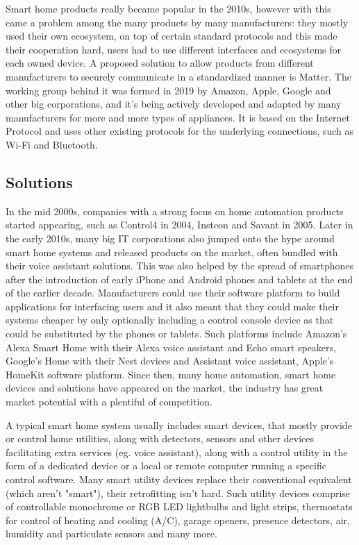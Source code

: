 Smart home products really became popular in the 2010s, however with this came a problem among the many products by many manufacturers: they mostly used their own ecosystem, on top of certain standard protocols and this made their cooperation hard, users had to use different interfaces and ecosystems for each owned device. A proposed solution to allow products from different manufacturers to securely communicate in a standardized manner is Matter. \cite{PCMagMatter} The working group behind it was formed in 2019 by Amazon, Apple, Google and other big corporations, and it's being actively developed and adapted by many manufacturers for more and more types of appliances. It is based on the Internet Protocol and uses other existing protocols for the underlying connections, such as Wi-Fi and Bluetooth.

\subsection{Solutions}

In the mid 2000s, companies with a strong focus on home automation products started appearing, such as Control4 in 2004, Insteon and Savant in 2005. \cite{Control4about} \cite{WPInsteonFirstLook} \cite{SavantCompInfo}\break
Later in the early 2010s, many big IT corporations also jumped onto the hype around smart home systems and released products on the market, often bundled with their voice assistant solutions. This was also helped by the spread of smartphones after the introduction of early iPhone and Android phones and tablets at the end of the earlier decade. Manufacturers could use their software platform to build applications for interfacing users and it also meant that they could make their systems cheaper by only optionally including a control console device as that could be substituted by the phones or tablets. Such platforms include Amazon's Alexa Smart Home with their Alexa voice assistant and Echo smart speakers, Google's Home with their Nest devices and Assistant voice assistant, Apple's HomeKit software platform. \cite{AmazonAlexaSH} \cite{GoogleHome} \cite{GoogleAssistant} \cite{AppleHome} Since then, many home automation, smart home devices and solutions have appeared on the market, the industry has great market potential with a plentiful of competition. \cite{ChakSHS}

A typical smart home system usually includes smart devices, that mostly provide or control home utilities, along with detectors, sensors and other devices facilitating extra services (eg. voice assistant), along with a control utility in the form of a dedicated device or a local or remote computer running a specific control software. Many smart utility devices replace their conventional equivalent (which aren't "smart"), their retrofitting isn't hard. Such utility devices comprise of controllable monochrome or RGB LED lightbulbs and light strips, thermostats for control of heating and cooling (A/C), garage openers, presence detectors, air, humidity and particulate sensors and many more. \cite{TechTargetSH}

